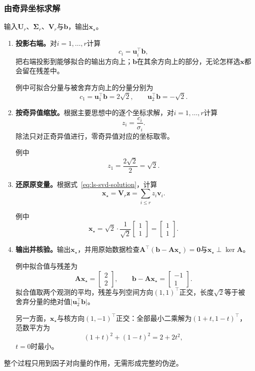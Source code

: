 \subsubsection{由奇异坐标求解}
输入$\bm U_r$、$\bm\Sigma_r$、$\bm V_r$与$\bm b$，输出$\bm x_\star$。
\begin{enumerate}
 \item \textbf{投影右端。}对$i=1,\ldots,r$计算
 \[
  c_i=\bm u_i^\top\bm b ,
 \]
 把右端投影到能够拟合的输出方向上；$\bm b$在其余方向上的部分，无论怎样选$\bm x$都会留在残差中。

 例中可拟合分量与被舍弃方向上的分量分别为
 \[
  c_1=\bm u_1^\top\bm b=2\sqrt2,\qquad \bm u_2^\top\bm b=-\sqrt2 .
 \]

 \item \textbf{按奇异值缩放。}根据主要思想中的逐个坐标求解，对$i=1,\ldots,r$计算
 \[
  z_i=\frac{c_i}{\sigma_i} .
 \]
 除法只对正奇异值进行，零奇异值对应的坐标取零。

 例中
 \[
  z_1=\frac{2\sqrt2}2=\sqrt2 .
 \]

 \item \textbf{还原原变量。}根据式~\eqref{eq:ls-svd-solution}，计算
 \[
  \bm x_\star=\bm V_r\bm z=\sum_{i\leq r}z_i\bm v_i .
 \]
 
 例中
 \[
  \bm x_\star=\sqrt2\cdot\frac1{\sqrt2}\begin{bmatrix}1\\1\end{bmatrix}=\begin{bmatrix}1\\1\end{bmatrix}.
 \]

 \item \textbf{输出并核验。}输出$\bm x_\star$，并用原始数据检查$\bm A^\top(\bm b-\bm A\bm x_\star)=\bm0$与$\bm x_\star\perp\ker\bm A$。

 例中拟合值与残差为
 \[
  \bm A\bm x_\star=\begin{bmatrix}2\\2\end{bmatrix},\qquad
  \bm b-\bm A\bm x_\star=\begin{bmatrix}-1\\1\end{bmatrix}.
 \]
 拟合值取两个观测的平均，残差与列空间方向$(1,1)^\top$正交，长度$\sqrt2$等于被舍弃分量的绝对值$\lvert\bm u_2^\top\bm b\rvert$。

 另一方面，$\bm x_\star$与核方向$(1,-1)^\top$正交：全部最小二乘解为$(1+t,1-t)^\top$，范数平方为
 \[
  (1+t)^2+(1-t)^2=2+2t^2 ,
 \]
 $t=0$时最小。
\end{enumerate}
整个过程只用到因子对向量的作用，无需形成完整的伪逆。

